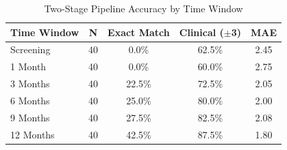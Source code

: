 \begin{table}[htbp]
\centering
\caption{Two-Stage Pipeline Accuracy by Time Window}
\label{tab:two_stage_windows_20}
\begin{tabular}{lcccc}
\toprule
\textbf{Time Window} & \textbf{N} & \textbf{Exact Match} & \textbf{Clinical ($\pm$3)} & \textbf{MAE} \\
\midrule
Screening & 40 & 0.0\% & 62.5\% & 2.45 \\
1 Month & 40 & 0.0\% & 60.0\% & 2.75 \\
3 Months & 40 & 22.5\% & 72.5\% & 2.05 \\
6 Months & 40 & 25.0\% & 80.0\% & 2.00 \\
9 Months & 40 & 27.5\% & 82.5\% & 2.08 \\
12 Months & 40 & 42.5\% & 87.5\% & 1.80 \\
\bottomrule
\end{tabular}
\end{table}


